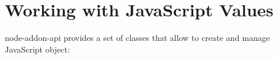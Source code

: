 \chapter{Working with Java\+Script Values}
\hypertarget{md__2_users_2hello_2_documents_2_git_hub_2finalproject-engine-drop-table-engines_2_engine_2src_29e3849c4e62daced40f86fcb24f0ba58}{}\label{md__2_users_2hello_2_documents_2_git_hub_2finalproject-engine-drop-table-engines_2_engine_2src_29e3849c4e62daced40f86fcb24f0ba58}
\label{md__2_users_2hello_2_documents_2_git_hub_2finalproject-engine-drop-table-engines_2_engine_2src_29e3849c4e62daced40f86fcb24f0ba58_autotoc_md8073}%
%


{\ttfamily node-\/addon-\/api} provides a set of classes that allow to create and manage Java\+Script object\+:


